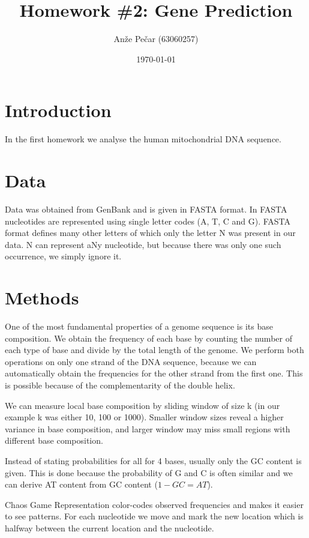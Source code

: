 \documentclass[a4paper,11pt]{article}
\title{Homework \#2: Gene Prediction}
\author{Anže Pečar (63060257)}
\date{\today}
\begin{document}
\maketitle

\section{Introduction}

In the first homework we analyse the human mitochondrial DNA sequence.   

\section{Data}

Data was obtained from GenBank and is given in FASTA format. In FASTA nucleotides are represented using single letter codes (A, T, C and G). FASTA format defines many other letters of which only the letter N was present in our data. N can represent aNy nucleotide, but because there was only one such occurrence, we simply ignore it. 

\section{Methods}
One of the most fundamental properties of a genome sequence is its base composition. We obtain the frequency of each base by counting the number of each type of base and divide by the total length of the genome. We perform both operations on only one strand of the DNA sequence, because we can automatically obtain the frequencies for the other strand from the first one. This is possible because of the complementarity of the double helix.

We can measure local base composition by sliding window of size k (in our example k was either 10, 100 or 1000). Smaller window sizes reveal a higher variance in base composition, and larger window may miss small regions with different base composition.

Instead of stating probabilities for all for 4 bases, usually only the GC content is given. This is done because the probability of G and C is often similar and we can derive AT content from GC content ($1 - GC = AT$). 

Chaos Game Representation color-codes observed frequencies and makes it easier to see patterns. For each nucleotide we move and mark the new location which is halfway between the current location and the nucleotide.
\end{document}
